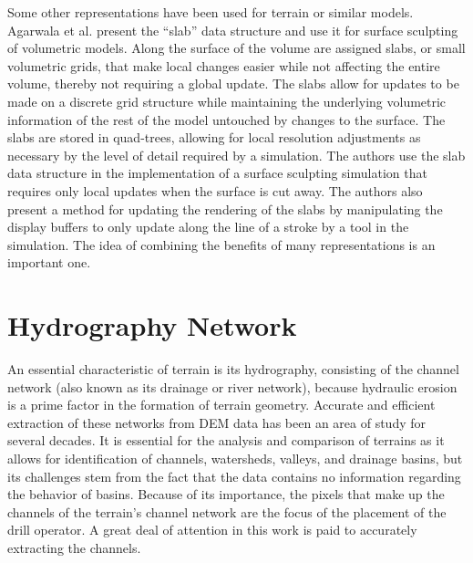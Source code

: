 Some other representations have been used for terrain or similar models. Agarwala et al. \cite{argwala-Volume} present the ``slab'' data structure and use it for surface sculpting of volumetric models. Along the surface of the volume are assigned slabs, or small volumetric grids, that make local changes easier while not affecting the entire volume, thereby not requiring a global update. The slabs allow for updates to be made on a discrete grid structure while maintaining the underlying volumetric information of the rest of the model untouched by changes to the surface. The slabs are stored in quad-trees, allowing for local resolution adjustments as necessary by the level of detail required by a simulation. The authors use the slab data structure in the implementation of a surface sculpting simulation that requires only local updates when the surface is cut away. The authors also present a method for updating the rendering of the slabs by manipulating the display buffers to only update along the line of a stroke by a tool in the simulation. 
The idea of combining the benefits of many representations is an important one.

\section{Hydrography Network}
\label{section:PriorLiteratureChannelNetworkExtraction}


An essential characteristic of terrain is its hydrography, consisting of the channel network (also known as its drainage or river network),
because hydraulic erosion is a prime factor in the
formation of terrain geometry.
Accurate and efficient extraction of these networks
from DEM data has been an area of study for several
decades. It is essential for the analysis and comparison of terrains
as it allows for identification of channels, watersheds, valleys, and
drainage basins, but its challenges stem from the fact that the data
contains no information regarding the behavior of basins.
% 
Because of its importance, the pixels that make up the channels of the terrain's channel network 
are the focus of the placement of the drill operator. A great deal of attention in this 
work is paid to accurately extracting the channels.

